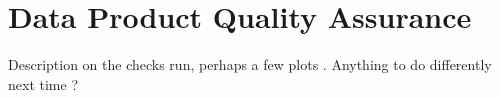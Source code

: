 \section{Data Product Quality Assurance} \label{sec:qa}

Description on the checks run, perhaps a few plots .
Anything to do differently next time ?
